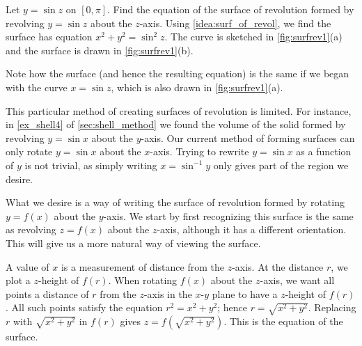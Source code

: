 
\begin{example}\label{ex_surfrev1}%
Let $y=\sin z$ on $[0,\pi]$. Find the equation of the surface of revolution formed by revolving $y=\sin z$ about the $z$-axis.
\solution
Using \autoref{idea:surf_of_revol}, we find the surface has equation $x^2+y^2=\sin^2z$. The curve is sketched in \autoref{fig:surfrev1}(a) and the surface is drawn in \autoref{fig:surfrev1}(b).

Note how the surface (and hence the resulting equation) is the same if we began with the curve $x=\sin z$, which is also drawn in \autoref{fig:surfrev1}(a).
\end{example}

This particular method of creating surfaces of revolution is limited. For instance, in \autoref{ex_shell4} of \autoref{sec:shell_method} we found the volume  of the solid formed by revolving $y=\sin x$ about the $y$-axis. Our current method of forming surfaces can only rotate $y=\sin x$ about the $x$-axis. Trying to rewrite $y=\sin x$ as a function of $y$ is not trivial, as simply writing $x=\sin^{-1}y$ only gives part of the region we desire.

What we desire is a way of writing the surface of revolution formed by rotating $y=f(x)$ about the $y$-axis. We start by first recognizing this surface is the same as revolving $z=f(x)$ about the $z$-axis, although it has a different orientation. This will give us a more natural way of viewing the surface. 

A value of $x$ is a measurement of distance from the $z$-axis. At the distance $r$, we plot a $z$-height of $f(r)$. When rotating $f(x)$ about the $z$-axis, we want all points a distance of $r$ from the $z$-axis in the $x$-$y$ plane to have a $z$-height of $f(r)$. All such points satisfy the equation $r^2=x^2+y^2$; hence $r=\sqrt{x^2+y^2}$. Replacing $r$ with $\sqrt{x^2+y^2}$ in $f(r)$ gives $z=f(\sqrt{x^2+y^2})$. This is the equation of the surface.

